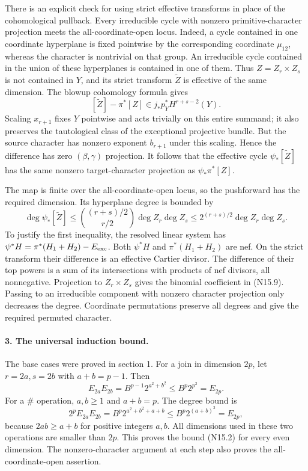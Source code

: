 There is an explicit check for using strict effective transforms
in place of the cohomological pullback.  Every irreducible
cycle with nonzero primitive-character projection meets the
all-coordinate-open locus.  Indeed, a cycle contained in
one coordinate hyperplane is fixed pointwise by the corresponding
coordinate $\mu_{12}$, whereas the character is nontrivial
on that group.  An irreducible cycle contained in the union
of these hyperplanes is contained in one of them.
Thus $Z=Z_r\times Z_s$ is not contained in $Y$, and its
strict transform $\widetilde Z$ is effective of the same
dimension.  The blowup cohomology formula gives
\[
 [\widetilde Z]-\pi^*[Z]
       \in j_*p_Y^*H^{r+s-2}(Y).
\]
Scaling $x_{r+1}$ fixes $Y$ pointwise and acts trivially
on this entire summand; it also preserves the tautological
class of the exceptional projective bundle.  But the source
character has nonzero exponent $b_{r+1}$ under this scaling.
Hence the difference has zero $(\beta,\gamma)$ projection.
It follows that the effective cycle $\psi_*[\widetilde Z]$
has the same nonzero target-character projection as
$\psi_*\pi^*[Z]$.

The map is finite over the all-coordinate-open locus, so the
pushforward has the required dimension.  Its hyperplane degree
is bounded by
\begin{equation}
 \deg\psi_*[\widetilde Z]
 \leq \binom{(r+s)/2}{r/2}\deg Z_r\deg Z_s
 \leq2^{(r+s)/2}\deg Z_r\deg Z_s.                 \tag{N15.9}
\end{equation}
To justify the first inequality, the resolved linear system has
$\psi^*H=\pi^*(H_1+H_2)-E_{\rm exc}$.
Both $\psi^*H$ and $\pi^*(H_1+H_2)$ are nef.  On the strict
transform their difference is an effective Cartier divisor.
The difference of their top powers is a sum of its intersections
with products of nef divisors, all nonnegative.  Projection
to $Z_r\times Z_s$ gives the binomial coefficient in (N15.9).
Passing to an irreducible component with nonzero character
projection only decreases the degree.  Coordinate permutations
preserve all degrees and give the required permuted character.

\paragraph{3. The universal induction bound.}
The base cases were proved in section 1.
For a join in dimension $2p$, let $r=2a,s=2b$ with
$a+b=p-1$.  Then
\[
 E_{2a}E_{2b}=B^{p-1}2^{a^2+b^2}
                         \leq B^p2^{p^2}=E_{2p}.
\]
For a $\#$ operation, $a,b\geq1$ and $a+b=p$.
The degree bound is
\[
 2^pE_{2a}E_{2b}=B^p2^{a^2+b^2+a+b}
                         \leq B^p2^{(a+b)^2}=E_{2p},
\]
because $2ab\geq a+b$ for positive integers $a,b$.
All dimensions used in these two operations are smaller than
$2p$.  This proves the bound (N15.2) for every even dimension.
The nonzero-character argument at each step also proves the
all-coordinate-open assertion.

